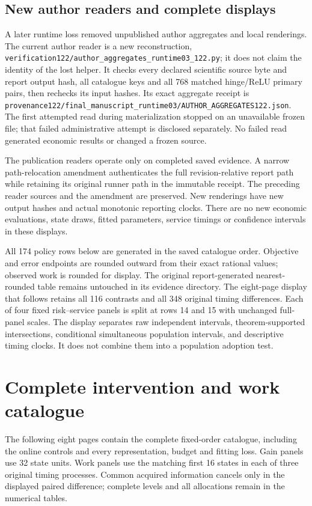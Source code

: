 \subsection{New author readers and complete displays}
A later runtime loss removed unpublished author aggregates and local
renderings. The current author reader is a new reconstruction,
\nolinkurl{verification122/author_aggregates_runtime03_122.py}; it does
not claim the identity of the lost helper. It checks every declared
scientific source byte and report output hash, all catalogue keys and
all 768 matched hinge/ReLU primary pairs, then rechecks its input hashes.
Its exact aggregate receipt is
\nolinkurl{provenance122/final_manuscript_runtime03/AUTHOR_AGGREGATES122.json}.
The first attempted read during materialization stopped on an unavailable
frozen file; that failed administrative attempt is disclosed separately.
No failed read generated economic results or changed a frozen source.

The publication readers operate only on completed saved evidence. A narrow
path-relocation amendment authenticates the full revision-relative report
path while retaining its original runner path in the immutable receipt.
The preceding reader sources and the amendment are preserved. New
renderings have new output hashes and actual monotonic reporting clocks.
There are no new economic evaluations, state draws, fitted parameters,
service timings or confidence intervals in these displays.

All 174 policy rows below are generated in the saved catalogue order.
Objective and error endpoints are rounded outward from their exact rational
values; observed work is rounded for display. The original report-generated
nearest-rounded table remains untouched in its evidence directory.
The eight-page display that follows retains all 116 contrasts and all 348
original timing differences. Each of four fixed risk--service panels is
split at rows 14 and 15 with unchanged full-panel scales. The display
separates raw independent intervals, theorem-supported intersections,
conditional simultaneous population intervals, and descriptive timing
clocks. It does not combine them into a population adoption test.


\section{Complete intervention and work catalogue}
\label{dev:catalogue122}
The following eight pages contain the complete fixed-order catalogue,
including the online controls and every representation, budget and fitting
loss. Gain panels use 32 state units. Work panels use the matching first
16 states in each of three original timing processes. Common acquired
information cancels only in the displayed paired difference; complete
levels and all allocations remain in the numerical tables.
\clearpage
\begingroup
\hoffset=0pt\voffset=0pt

\clearpage
\endgroup
